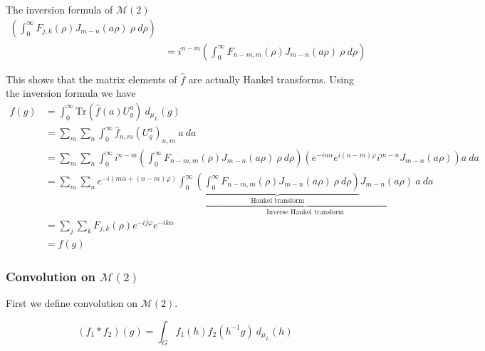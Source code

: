 \documentclass{article}
\begin{document}
\begin{Proof}{The inversion formula of $\mathcal{M}(2)$}
\[\begin{split}
                          \left(  \int^{\infty}_{0} F_{j,k}(\rho) J_{m-n}(a\rho)  \ \rho \ d\rho   \right) \\
                          &=
                          i^{n-m}
                          \left(  \int^{\infty}_{0} F_{n-m,m}(\rho) J_{m-n}(a\rho)  \ \rho \ d\rho   \right) \\
                          \\
        \end{split}
    \]%
    This shows that the matrix elements of $\hat{f}$ are actually Hankel transforms.
    Using the inversion formula we have
    \[%
        \begin{split}
            f(g) &= \int^{\infty}_{0} \text{Tr}\left(\hat{f}(a)U^{a}_{g}\right) \ d_{\mu_{L}}(g) \\
                 &=  \sum_{m} \sum_{n} \int^{\infty}_{0} \hat{f}_{n,m} (U^{a}_{g})_{n,m} \ a \ da \\
                 &=  \sum_{m} \sum_{n} \int^{\infty}_{0} 
                          i^{n-m}
                \left( 
                    \int^{\infty}_{0} F_{n-m,m}(\rho) J_{m-n}(a\rho)  \ \rho \ d\rho  
                \right)
                \left(
                    e^{-in\alpha} e^{i(n-m)\varphi}i^{m-n}J_{m-n}(a\rho)   
                \right) a \ da \\
                 &= 
                 \sum_{m} \sum_{n} e^{-i(m\alpha + (n-m)\varphi)}
                 \underbrace{
                 \int^{\infty}_{0} 
                 \underbrace{
                 \left(
                    \int^{\infty}_{0} F_{n-m,m}(\rho) J_{m-n}(a\rho)  \ \rho \ d\rho  
                 \right)}_{\text{Hankel transform}}
                 J_{m-n}(a\rho)  \ a \ da
                 }_{\text{Inverse Hankel transform}}
                 \\
                 &= 
                 \sum_{j} \sum_{k} F_{j,k}(\rho) e^{-ij\varphi} e^{-ik\alpha}
                 \\
                 &= f(g)
        \end{split}
    \]%
\end{Proof}

\subsubsection{Convolution on $\mathcal{M}(2)$} 

First we define convolution on $\mathcal{M}(2)$.
\begin{define}
    \[%
        (f_1 * f_2) (g) =  \int_{G} f_1(h) f_2(h^{-1}g)\ d_{\mu_{L}}(h)
    \]%
\end{define}
\end{document}
